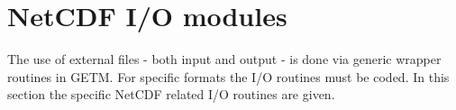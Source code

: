 \section{NetCDF I/O modules}

The use of external files - both input and output - is done via 
generic wrapper routines in GETM. For specific formats the I/O 
routines must be coded. In this section the specific NetCDF related 
I/O routines are given.

